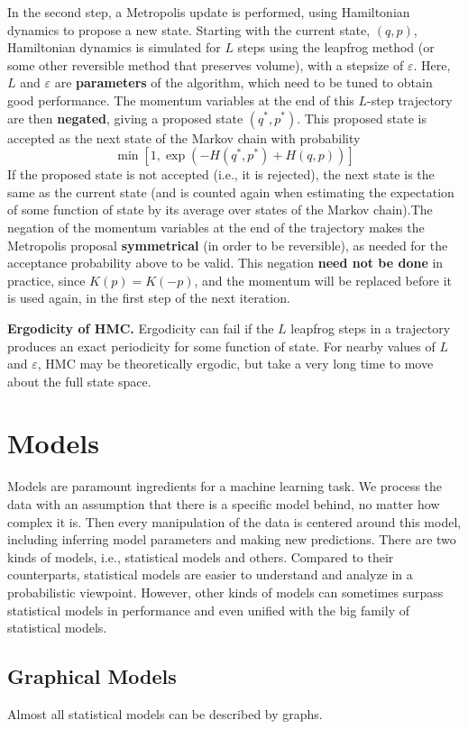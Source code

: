 \documentclass[a4paper]{book}
\begin{document}
In the second step, a Metropolis update is performed, using Hamiltonian dynamics to propose
a new state. Starting with the current state, $(q, p)$, Hamiltonian dynamics is simulated
for $L$ steps using the leapfrog method (or some other reversible method that preserves volume),
with a stepsize of $\varepsilon$. Here, $L$ and $\varepsilon$ are \textbf{parameters} of the algorithm, which need to be
tuned to obtain good performance. The momentum variables at the end of this $L$-step trajectory are then \textbf{negated}, giving a proposed state $(q^*,p^*)$. This proposed state is accepted as the next state of the Markov chain with probability
\begin{equation}
	\min \left[ 1, \exp(- H(q^*,p^*) + H(q,p)) \right]
\end{equation}
If the proposed state is not accepted (i.e., it is rejected), the next state is the same as the
current state (and is counted again when estimating the expectation of some function of state
by its average over states of the Markov chain).The negation of the momentum variables
at the end of the trajectory makes the Metropolis proposal \textbf{symmetrical} (in order to be reversible), as needed for the
acceptance probability above to be valid. This negation \textbf{need not be done} in practice, since
$K(p) = K(-p)$, and the momentum will be replaced before it is used again, in the first step
of the next iteration. 

\textbf{Ergodicity of HMC.} Ergodicity can fail if the $L$ leapfrog steps in a trajectory produces an exact periodicity for some function of state. For nearby values of $L$ and $\varepsilon$, HMC may be theoretically ergodic, but take a very
long time to move about the full state space.
\chapter{Models}
Models are paramount ingredients for a machine learning task. We process the data with an assumption that there is a specific model behind, no matter how complex it is. Then every manipulation of the data is centered around this model, including inferring model parameters and making new predictions. There are two kinds of models, i.e., statistical models and others. Compared to their counterparts, statistical models are easier to understand and analyze in a probabilistic viewpoint. However, other kinds of models can sometimes surpass statistical models in performance and even unified with the big family of statistical models.
\section{Graphical Models}
Almost all statistical models can be described by graphs.
\end{document}
